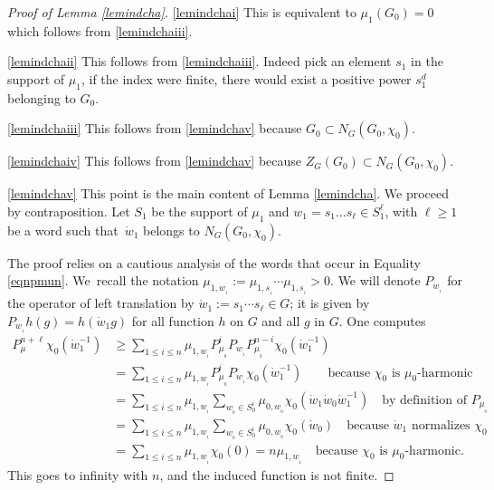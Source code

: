 \skpt
\begin{proof}[Proof of Lemma \ref{lemindcha}]
\eqref{lemindchai} This is equivalent to $\mu_1(G_0)=0$ which follows from \eqref{lemindchaiii}.

\eqref{lemindchaii} This follows from \eqref{lemindchaiii}. Indeed pick an element $s_1$
in the support of $\mu_1$, if the index were finite, there would exist a
positive power
$s_1^d$ belonging to $G_0$.

\eqref{lemindchaiii} This follows from \eqref{lemindchav} because $G_0\subset N_G(G_0,\chi_0)$.

\eqref{lemindchaiv} This follows from \eqref{lemindchav} because $Z_G(G_0)\subset N_G(G_0,\chi_0)$.

\eqref{lemindchav} This point is the main content of Lemma \ref{lemindcha}. We proceed by contraposition.
Let $S_1$ be the support of $\mu_1$ and
$w_1=s_1\ldots s_\ell\in S_1^\ell$, with $\ell\geq 1$ be a word
such that~$\dot{w}_{1}$ belongs to $N_G(G_0,\chi_0)$.

The proof relies on a cautious analysis of the words that occur in Equality \eqref{eqnpmun}.
We~recall the notation
$\mu_{1,w_{_1}}:=\mu_{1,s_{_1}}\!\cdots\mu_{1,s_{_\ell}}>0$.
We will denote $P_{w_{_1}}$ for the operator
of left translation by $\dot{w}_{1}:=s_1\cdots s_\ell\in G$; it is given by
$P_{w_{_1}}h(g)=h(\dot{w}_{1}g)$ for all function $h$ on $G$ and all $g$ in $G$.
One computes
\begin{align*}
P_\mu^{n+\ell}\chi_0(\dot{w}_{1}^{-1})
&\geq \sum_{1\leq i\leq n}
\mu_{1,w_{_1}} P^i_{\mu_{_0}}P_{w_{_1}}P^{n-i}_{\mu_{_0}}\chi_0(\dot{w}_{1}^{-1})\\
&= \sum_{1\leq i\leq n}
\mu_{1,w_{_1}} P^i_{\mu_{_0}}P_{w_{_1}}\chi_0(\dot{w}_{1}^{-1})
\hspace{2em}\text{because $\chi_0$ is $\mu_0$-harmonic}\\
&= \sum_{1\leq i\leq n} \mu_{1,w_{_1}}
\sum_{w_{_0}\in S_0^i}\mu_{0,w_{_0}}
\chi_0(\dot{w}_{1}\dot{w}_{0}\dot{w}_{1}^{-1})
\hspace{1em}\text{by definition of $P_{\mu_{_0}}$}\\
&= \sum_{1\leq i\leq n} \mu_{1,w_{_1}}
\sum_{w_{_0}\in S_0^i}\mu_{0,w_{_0}}
\chi_0(\dot{w}_{0})
\hspace{1em}\text{because $\dot{w}_{1}$ normalizes $\chi_0$}\\
&= \sum_{1\leq i\leq n} \mu_{1,w_{_1}}
\chi_0(0)= n\mu_{1,w_{_1}}
\hspace{1em}\text{because $\chi_0$ is $\mu_0$-harmonic.}
\end{align*}
This goes to infinity with $n$, and the induced function is not finite.
\end{proof}

